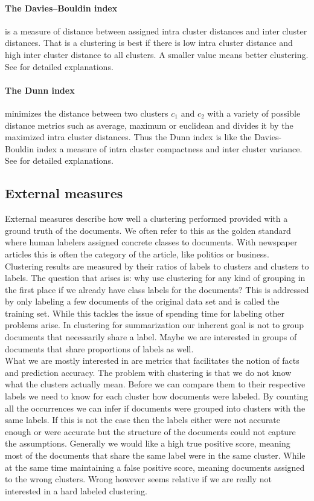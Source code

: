     \paragraph{The Davies–Bouldin index} is a measure of distance between assigned intra cluster distances and inter cluster distances. That is a clustering is best if there is low intra cluster distance and high inter cluster distance to all clusters. A smaller value means better clustering. See \cite{DavisBouldin1979} for detailed explanations.

    \paragraph{The Dunn index} minimizes the distance between two clusters $c_1$ and $c_2$ with a variety of possible distance metrics such as average, maximum or euclidean and divides it by the maximized intra cluster distances. Thus the Dunn index is like the Davies-Bouldin index a measure of intra cluster compactness and inter cluster variance. See \cite{DunnIndex1973} for detailed explanations. 

  \subsection{External measures}
  \label{sec:external_measures}

    External measures describe how well a clustering performed provided with a ground truth of the documents. We often refer to this as the golden standard where human labelers assigned concrete classes to documents. With newspaper articles this is often the category of the article, like politics or business. Clustering results are measured by their ratios of labels to clusters and clusters to labels. The question that arises is: why use clustering for any kind of grouping in the first place if we already have class labels for the documents? This is addressed by only labeling a few documents of the original data set and is called the training set. While this tackles the issue of spending time for labeling other problems arise. In clustering for summarization our inherent goal is not to group documents that necessarily share a label. Maybe we are interested in groups of documents that share proportions of labels as well.\\
    What we are mostly interested in are metrics that facilitates the notion of facts and prediction accuracy. The problem with clustering is that we do not know what the clusters actually mean. Before we can compare them to their respective labels we need to know for each cluster how documents were labeled. By counting all the occurrences we can infer if documents were grouped into clusters with the same labels. If this is not the case then the labels either were not accurate enough or were accurate but the structure of the documents could not capture the assumptions. Generally we would like a high true positive score, meaning most of the documents that share the same label were in the same cluster. While at the same time maintaining a false positive score, meaning documents assigned to the wrong clusters. Wrong however seems relative if we are really not interested in a hard labeled clustering.

